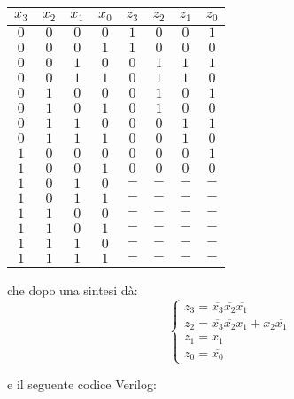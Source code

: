 \documentclass[a4paper,11pt]{article}
\begin{document}
\begin{table}[H]
	\center 
	\begin{tabular} { c  c  c  c | c  c  c  c }
		$x_3$ & $x_2$ & $x_1$ & $x_0$ & $z_3$ & $z_2$ & $z_1$ & $z_0$ \\ 
		\hline
		$0$ & $0$ & $0$ & $0$ & $1$ & $0$ & $0$ & $1$ \\
		$0$ & $0$ & $0$ & $1$ & $1$ & $0$ & $0$ & $0$ \\
		$0$ & $0$ & $1$ & $0$ & $0$ & $1$ & $1$ & $1$ \\
		$0$ & $0$ & $1$ & $1$ & $0$ & $1$ & $1$ & $0$ \\
		$0$ & $1$ & $0$ & $0$ & $0$ & $1$ & $0$ & $1$ \\
		$0$ & $1$ & $0$ & $1$ & $0$ & $1$ & $0$ & $0$ \\
		$0$ & $1$ & $1$ & $0$ & $0$ & $0$ & $1$ & $1$ \\
		$0$ & $1$ & $1$ & $1$ & $0$ & $0$ & $1$ & $0$ \\
		$1$ & $0$ & $0$ & $0$ & $0$ & $0$ & $0$ & $1$ \\
		$1$ & $0$ & $0$ & $1$ & $0$ & $0$ & $0$ & $0$ \\
		$1$ & $0$ & $1$ & $0$ & $-$ & $-$ & $-$ & $-$ \\
		$1$ & $0$ & $1$ & $1$ & $-$ & $-$ & $-$ & $-$ \\
		$1$ & $1$ & $0$ & $0$ & $-$ & $-$ & $-$ & $-$ \\
		$1$ & $1$ & $0$ & $1$ & $-$ & $-$ & $-$ & $-$ \\
		$1$ & $1$ & $1$ & $0$ & $-$ & $-$ & $-$ & $-$ \\
		$1$ & $1$ & $1$ & $1$ & $-$ & $-$ & $-$ & $-$ \\
	\end{tabular}
\end{table}

che dopo una sintesi dà:
\[
	\begin{cases}
		z_3	= \overline{x_3}\overline{x_2}\overline{x_1} \\ 
		z_2 = \overline{x_3}\overline{x_2}x_1 + x_2\overline{x_1} \\ 
		z_1 = x_1 \\ 
		z_0 = \overline{x_0}
	\end{cases}
\]

e il seguente codice Verilog:


\end{document}
